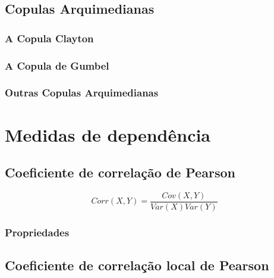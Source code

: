 \documentclass[
	12pt,				%
	oneside,			%
	a4paper,			%
	chapter=TITLE,		%
	section=TITLE,		%
	english,			%
	brazil				%
	]{abntex2}
\begin{document}
\hypertarget{copulas-arquimedianas}{%
\subsection{Copulas Arquimedianas}\label{copulas-arquimedianas}}

\hypertarget{a-copula-clayton}{%
\subsubsection{A Copula Clayton}\label{a-copula-clayton}}

\hypertarget{a-copula-de-gumbel}{%
\subsubsection{A Copula de Gumbel}\label{a-copula-de-gumbel}}

\hypertarget{outras-copulas-arquimedianas}{%
\subsubsection{Outras Copulas Arquimedianas}\label{outras-copulas-arquimedianas}}

\hypertarget{medidas-de-dependuxeancia}{%
\section{Medidas de dependência}\label{medidas-de-dependuxeancia}}

\hypertarget{coeficiente-de-correlauxe7uxe3o-de-pearson}{%
\subsection{Coeficiente de correlação de Pearson}\label{coeficiente-de-correlauxe7uxe3o-de-pearson}}

\[Corr(X, Y ) = \frac{Cov(X, Y )}{Var(X)Var(Y)}\]

\hypertarget{propriedades}{%
\subsubsection{Propriedades}\label{propriedades}}

\hypertarget{coeficiente-de-correlauxe7uxe3o-local-de-pearson}{%
\subsection{Coeficiente de correlação local de Pearson}\label{coeficiente-de-correlauxe7uxe3o-local-de-pearson}}
\end{document}
